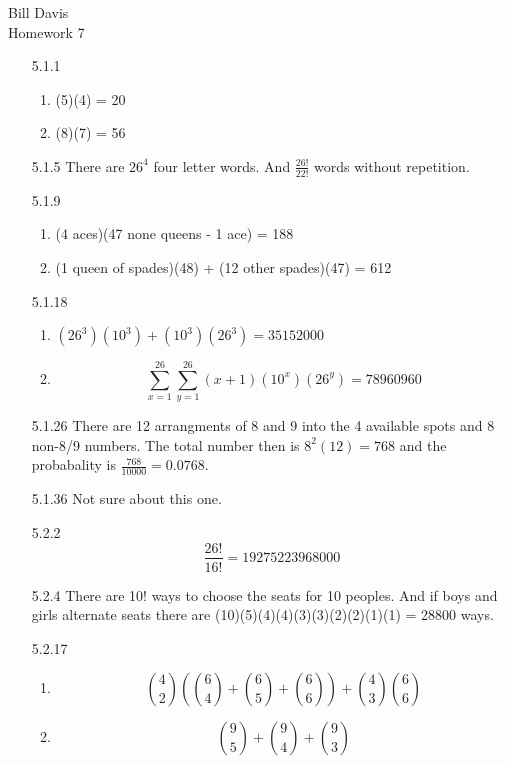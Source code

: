 \documentclass{article}
\begin{document}
Bill Davis\\
Homework 7

\begin{enumerate}

\item[5.1.1]
\begin{enumerate}  
    \item (5)(4) = 20
    \item (8)(7) = 56
\end{enumerate}

\item[5.1.5]
There are $26^4$ four letter words. And $\frac{26!}{22!}$ words without repetition.

\item[5.1.9]
\begin{enumerate}
\item (4 aces)(47 none queens - 1 ace) = 188
\item (1 queen of spades)(48) + (12 other spades)(47) = 612
\end{enumerate}

\item[5.1.18]
\begin{enumerate}
\item 
$(26^3)(10^3) + (10^3)(26^3) = 35152000$
\item
\[
\sum_{x=1}^{26}\sum_{y=1}^{26} (x+1)(10^x)(26^y) = 78960960
\]

\end{enumerate}

\item[5.1.26]
There are 12 arrangments of 8 and 9 into the 4 available spots and 8 non-8/9 numbers. The total number then is $8^2(12)=768$ and the probabality is $\frac{768}{10000} = 0.0768$. 

\item[5.1.36]
Not sure about this one. 
\item[5.2.2]
\[
\frac{26!}{16!} = 19275223968000
\]

\item[5.2.4]
There are 10! ways to choose the seats for 10 peoples. And if boys and girls alternate seats there are (10)(5)(4)(4)(3)(3)(2)(2)(1)(1) = 28800 ways. 

\item[5.2.17]
\begin{enumerate}
\item
\[
{4 \choose 2}\left( {6 \choose 4} + {6 \choose 5} + {6 \choose 6}\right) + {4 \choose 3} {6 \choose 6} 
\]

\item
\[ 
{9 \choose 5} + {9 \choose 4}  + {9 \choose 3} 
\]


\end{enumerate}
\end{enumerate}
\end{document}
